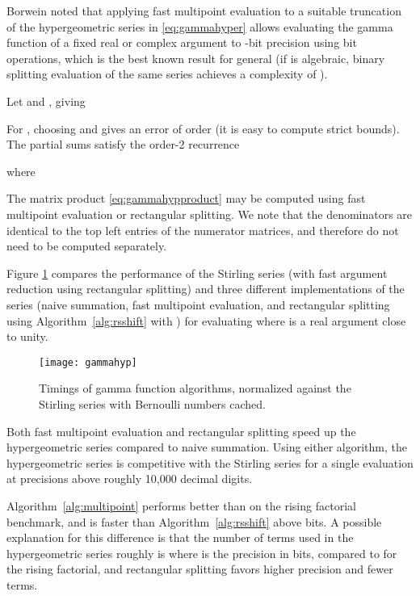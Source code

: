 \documentclass{sig-alternate}
\begin{document}
Borwein \cite{Borwein1987} noted that applying fast multipoint evaluation
to a suitable truncation of the hypergeometric series in \eqref{eq:gammahyper}
allows evaluating the gamma function
of a fixed real or complex argument to -bit precision
using  bit operations,
which is the best known result for general  (if  is algebraic,
binary splitting evaluation of the same series
achieves a complexity of ).

Let  and ,
giving

For , choosing
 and 
gives an error of order  (it
is easy to compute strict bounds). The partial sums
satisfy the order-2 recurrence

where

The matrix product \eqref{eq:gammahypproduct} may be computed
using fast multipoint evaluation
or rectangular splitting. We note that the denominators
are identical to the top left entries of the numerator matrices,
and therefore do not need to be computed separately.

Figure \ref{fig:gammahyp} compares
the performance of the Stirling series (with fast argument reduction using rectangular splitting)
and three different implementations of the  series (naive summation,
fast multipoint evaluation, and rectangular splitting
using Algorithm~\ref{alg:rsshift} with )
for evaluating  where  is a real argument
close to unity.

\begin{figure}[width=8cm] \label{fig:gammahyp}
\begin{center}
\texttt{[image: gammahyp]}
\caption{Timings of gamma function algorithms,
normalized against the Stirling series with Bernoulli numbers cached.}
\end{center}
\end{figure}

Both fast multipoint evaluation and rectangular splitting
speed up the hypergeometric series
compared to naive summation.
Using either algorithm, the
hypergeometric series is competitive with the Stirling
series for a single evaluation
at precisions above roughly 10,000 decimal digits.

Algorithm~\ref{alg:multipoint} performs better than on
the rising factorial benchmark, and is
faster than Algorithm~\ref{alg:rsshift} above  bits.
A possible explanation for this difference is that
the number of terms used in the hypergeometric series roughly is 
where  is the precision in bits, compared to 
for the rising factorial, and rectangular splitting
favors higher precision and fewer terms.
\end{document}
